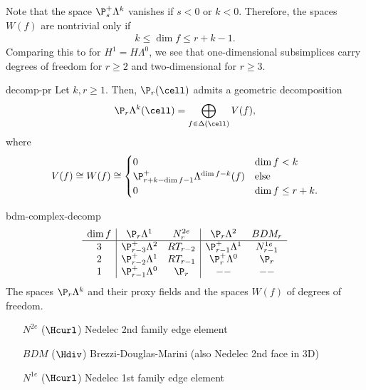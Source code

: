 \begin{remark}
  Note that the space $\P_s^+\Lambda^k$ vanishes if $s<0$ or
  $k<0$. Therefore, the spaces $W(f)$ are nontrivial only if
  \begin{gather}
    k \le \dim f \le r+k-1.
  \end{gather}
  Comparing this to  for
  $H^1 = H\Lambda^0$, we see that one-dimensional subsimplices carry
  degrees of freedom for $r\ge 2$ and two-dimensional for $r\ge 3$.
\end{remark}

\begin{Theorem}{decomp-pr}
  Let $k,r\ge 1$. Then, $\P_r(\cell)$ admits a geometric decomposition
  \begin{gather}
    \P_r\Lambda^k(\cell) = \bigoplus_{f\in\Delta(\cell)} V(f),
  \end{gather}
  where
  \begin{gather}
    V(f) \cong W(f) \cong
    \begin{cases}
      0 & \dim f < k\\
      \P_{r+k-\dim f-1}^+ \Lambda^{\dim f-k}(f) &\text{else}\\
      0 & \dim f \le r+k.
    \end{cases}
  \end{gather}
\end{Theorem}

\begin{Example}{bdm-complex-decomp}
  \begin{gather}
    \begin{array}{c|cc|cc}
      \dim f
      & \P_r\Lambda^1 & N^{2e}_r
      & \P_r\Lambda^2 & BDM_r \\\hline
      3 & \P_{r-3}^+\Lambda^2 & RT_{r-2} & \P_{r-1}^+\Lambda^1 & N^{1e}_{r-1} \\
      2 & \P_{r-2}^+\Lambda^1 & RT_{r-1} & \P_{r}^+\Lambda^0 & \P_r \\
      1 & \P_{r-1}^+\Lambda^0 & \P_r & --& --
    \end{array}
  \end{gather}
  The spaces $\P_r\Lambda^k$ and their proxy fields and the spaces
  $W(f)$ of degrees of freedom.
  
  \begin{itemize}
  \item [$N^{2e}$] ($\Hcurl$) Nedelec 2nd family edge element
  \item [$BDM$] ($\Hdiv$) Brezzi-Douglas-Marini (also Nedelec 2nd face in 3D)
  \item [$N^{1e}$] ($\Hcurl$) Nedelec 1st family edge element
  \end{itemize}
\end{Example}

